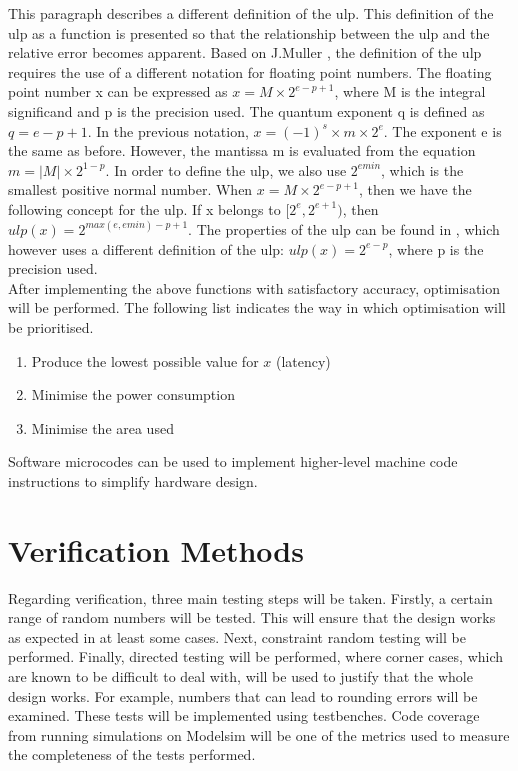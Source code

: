 \documentclass[11pt]{report}
\begin{document}
\noindent
This paragraph describes a different definition of the ulp. This definition of the ulp as a function is presented so that the relationship between the ulp and the relative error becomes apparent. Based on J.Muller \cite{ulp}, the definition of the ulp requires the use of a different notation for floating point numbers. The floating point number x can be expressed as $x = M \times 2^{e-p+1}$, where M is the integral significand and p is the precision used. The quantum exponent q is defined as $q = e-p+1$. In the previous notation, $x = (-1)^{s} \times m \times 2^{e}$. The exponent e is the same as before. However, the mantissa m is evaluated from the equation $m = |M| \times 2^{1-p}$. In order to define the ulp, we also use $2^{emin}$, which is the smallest positive normal number. When $x = M \times 2^{e-p+1}$, then we have the following concept for the ulp. If x belongs to $[2^{e}, 2^{e+1})$, then $ulp(x) = 2^{max(e, emin)-p+1}$. The properties of the ulp can be found in \cite{MPFR}, which however uses a different definition of the ulp: $ulp(x) = 2^{e-p}$, where p is the precision used.\\

\noindent
After implementing the above functions with satisfactory accuracy, optimisation will be performed. The following list indicates the way in which optimisation will be prioritised.

\begin{enumerate}
\item Produce the lowest possible value for $x$ (latency)
\item Minimise the power consumption
\item Minimise the area used
\end{enumerate}
\noindent
Software microcodes can be used to implement higher-level machine code instructions to simplify hardware design.\\ %

\section{Verification Methods}
Regarding verification, three main testing steps will be taken. Firstly, a certain range of random numbers will be tested. This will ensure that the design works as expected in at least some cases. Next, constraint random testing will be performed. Finally, directed testing will be performed, where corner cases, which are known to be difficult to deal with, will be used to justify that the whole design works. For example, numbers that can lead to rounding errors will be examined. These tests will be implemented using testbenches. Code coverage from running simulations on Modelsim will be one of the metrics used to measure the completeness of the tests performed.\\
\end{document}
